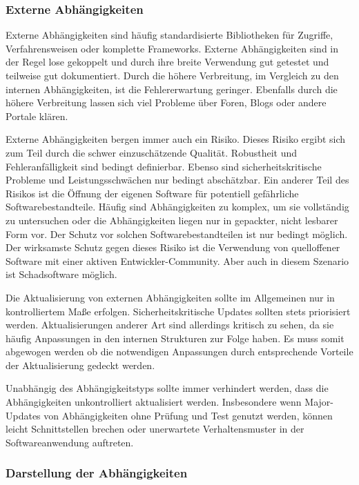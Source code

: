 \subsubsection{Externe Abhängigkeiten}

Externe Abhängigkeiten sind häufig standardisierte Bibliotheken für Zugriffe, Verfahrensweisen oder komplette Frameworks. Externe Abhängigkeiten sind in der Regel lose gekoppelt und durch ihre breite Verwendung gut getestet und teilweise gut dokumentiert. Durch die höhere Verbreitung, im Vergleich zu den internen Abhängigkeiten, ist die Fehlererwartung geringer. Ebenfalls durch die höhere Verbreitung lassen sich viel Probleme über Foren, Blogs oder andere Portale klären.

Externe Abhängigkeiten bergen immer auch ein Risiko. Dieses Risiko ergibt sich zum Teil durch die schwer einzuschätzende Qualität. Robustheit und Fehleranfälligkeit sind bedingt definierbar. Ebenso sind sicherheitskritische Probleme und Leistungsschwächen nur bedingt abschätzbar. Ein anderer Teil des Risikos ist die Öffnung der eigenen Software für potentiell gefährliche Softwarebestandteile. Häufig sind Abhängigkeiten zu komplex, um sie vollständig zu untersuchen oder die Abhängigkeiten liegen nur in gepackter, nicht lesbarer Form vor. Der Schutz vor solchen Softwarebestandteilen ist nur bedingt möglich. Der wirksamste Schutz gegen dieses Risiko ist die Verwendung von quelloffener Software mit einer aktiven Entwickler-Community. Aber auch in diesem Szenario ist Schadsoftware möglich.

Die Aktualisierung von externen Abhängigkeiten sollte im Allgemeinen nur in kontrolliertem Maße erfolgen. Sicherheitskritische Updates sollten stets priorisiert werden. Aktualisierungen anderer Art sind allerdings kritisch zu sehen, da sie häufig Anpassungen in den internen Strukturen zur Folge haben. Es muss somit abgewogen werden ob die notwendigen Anpassungen durch entsprechende Vorteile der Aktualisierung gedeckt werden.

Unabhängig des Abhängigkeitstyps sollte immer verhindert werden, dass die Abhängigkeiten unkontrolliert aktualisiert werden. Insbesondere wenn Major-Updates von Abhängigkeiten ohne Prüfung und Test genutzt werden, können leicht Schnittstellen brechen oder unerwartete Verhaltensmuster in der Softwareanwendung auftreten.

\subsubsection{Darstellung der Abhängigkeiten}
\label{subsubsec:illustrate-dependencies}

